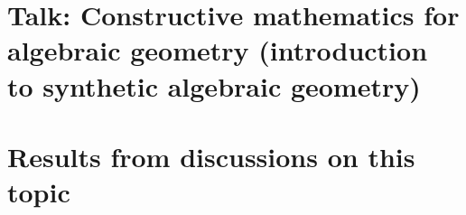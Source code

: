 \documentclass{../util/zariski-small}
\title{}
\theoremstyle{break}
\begin{document}
\author{Ingo Blechschmidt, Felix Cherubini and Matthias Hutzler}

\maketitle

\section*{Talk: Constructive mathematics for algebraic geometry (introduction to synthetic algebraic geometry)}


\section{Results from discussions on this topic}



\printbibliography
\end{document}
